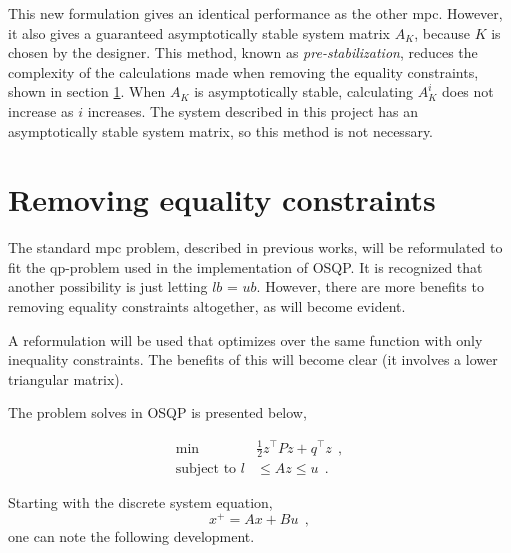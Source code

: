 This new formulation gives an identical performance as the other \acrshort{mpc}. However, it also gives a guaranteed asymptotically stable system matrix $A_K$, because $K$ is chosen by the designer. This method, known as \textit{pre-stabilization}, reduces the complexity of the calculations made when removing the equality constraints, shown in section \ref{sec:remove_eq_constr}. When $A_K$ is asymptotically stable, calculating $A_K^i$ does not increase as $i$ increases. The system described in this project has an asymptotically stable system matrix, so this method is not necessary.  


\section{Removing equality constraints}\label{sec:remove_eq_constr}
 
The standard \acrshort{mpc} problem, described in previous works, will be reformulated to fit the \acrshort{qp}-problem used in the implementation of OSQP. 
It is recognized that another possibility is just letting $lb$ = $ub$. However, there are more benefits to removing equality constraints altogether, as will become evident.

A reformulation will be used that optimizes over the same function with only inequality constraints. The benefits of this will become clear (it involves a lower triangular matrix). 

The problem solves in OSQP is presented below, 

 \begin{equation}
 \begin{split}
\min \: &\frac{1}{2} z^\top P z + q^\top z \: \: , \\
\text{subject to } l &\leq Az \leq u \: \: .
\end{split}
 \end{equation}


Starting with the discrete system equation, 
\begin{equation}
    x^+ = A x + B u \: \: ,
\end{equation}
one can note the following development.
 
